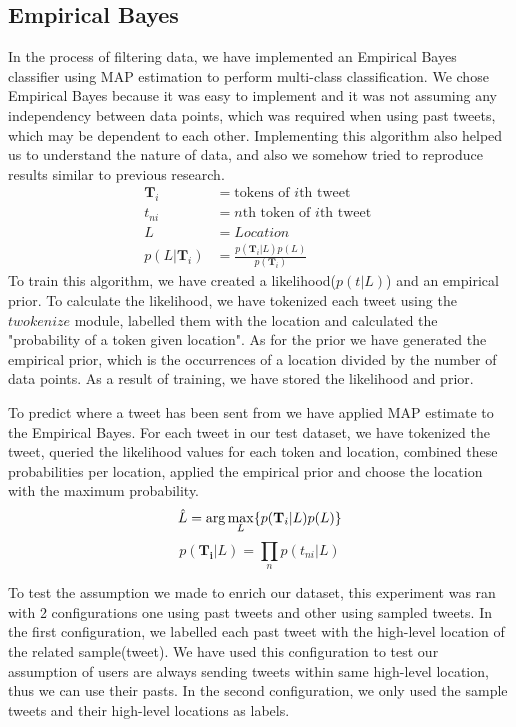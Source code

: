 \documentclass[twoside,11pt]{article}
\begin{document}
\subsection{Empirical Bayes}

In the process of filtering data, we have implemented an Empirical Bayes\cite{carlin1997bayes} classifier using MAP estimation\cite{degrooth} to perform multi-class classification. We chose Empirical Bayes because it was easy to implement and it was not assuming any independency between data points, which was required when using past tweets, which may be dependent to each other. Implementing this algorithm also helped us to understand the nature of data, and also we somehow tried to reproduce results similar to previous research.
\begin{equation*}
\begin{split}
\mathbf{T}_i & = \text{tokens of $i$th tweet }\\
t_{ni} & = \text{$n$th token of $i$th tweet }\\
L &= Location \\
p(L|\mathbf{T}_i) &= \frac{p(\mathbf{T}_i | L)p(L)}{p(\mathbf{T}_{i})} 
\end{split}
\end{equation*}
To train this algorithm, we have created a likelihood($p(t | L)$) and an empirical prior. To calculate the likelihood, we have tokenized each tweet using the $twokenize$ module\cite{gimpel2011part}, labelled them with the location and calculated the "probability of a token given location". As for the prior we have generated the empirical prior, which is the occurrences of a location divided by the number of data points. As a result of training, we have stored the likelihood and prior.

To predict where a tweet has been sent from we have applied MAP estimate to the Empirical Bayes. For each tweet in our test dataset, we have tokenized the tweet, queried the likelihood values for each token and location, combined these probabilities per location, applied the empirical prior and choose the location with the maximum probability.
\begin{equation*}
\hat{L} = \arg\max_L\{p(\mathbf{T}_i | L) p(L)\}\\
\end{equation*}
\begin{equation*}
p(\mathbf{T_i} | L) = \prod_n{p(t_{ni}|L)}
\end{equation*}

To test the assumption we made to enrich our dataset, this experiment was ran with 2 configurations one using past tweets and other using sampled tweets. In the first configuration, we labelled each past tweet with the high-level location of the related sample(tweet). We have used this configuration to test our assumption of users are always sending tweets within same high-level location, thus we can use their pasts. In the second configuration, we only used the sample tweets and their high-level locations as labels.
\end{document}
